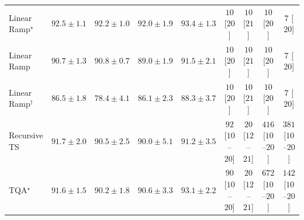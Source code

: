 \begin{tabular}{l|cccc|cccc|}
Linear Ramp$^\star$ & {\cellcolor[HTML]{045280}} \color[HTML]{F1F1F1} $92.5\pm 1.1$ & {\cellcolor[HTML]{045483}} \color[HTML]{F1F1F1} $92.2\pm 1.0$ & {\cellcolor[HTML]{045687}} \color[HTML]{F1F1F1} $92.0\pm 1.9$ & {\cellcolor[HTML]{034973}} \color[HTML]{F1F1F1} $93.4\pm 1.3$ & {\cellcolor[HTML]{FFF6F2}} \color[HTML]{000000} $10$ [$20$] & {\cellcolor[HTML]{FFF6F2}} \color[HTML]{000000} $10$ [$21$] & {\cellcolor[HTML]{FFF6F2}} \color[HTML]{000000} $10$ [$20$] & {\cellcolor[HTML]{FFF6F2}} \color[HTML]{000000} $7$ [$20$] \\
Linear Ramp & {\cellcolor[HTML]{045F95}} \color[HTML]{F1F1F1} $90.7\pm 1.3$ & {\cellcolor[HTML]{045F95}} \color[HTML]{F1F1F1} $90.8\pm 0.7$ & {\cellcolor[HTML]{0569A5}} \color[HTML]{F1F1F1} $89.0\pm 1.9$ & {\cellcolor[HTML]{045A8D}} \color[HTML]{F1F1F1} $91.5\pm 2.1$ & {\cellcolor[HTML]{FFF6F2}} \color[HTML]{000000} $10$ [$20$] & {\cellcolor[HTML]{FFF6F2}} \color[HTML]{000000} $10$ [$21$] & {\cellcolor[HTML]{FFF6F2}} \color[HTML]{000000} $10$ [$20$] & {\cellcolor[HTML]{FFF6F2}} \color[HTML]{000000} $7$ [$20$] \\
Linear Ramp$^\dagger$ & {\cellcolor[HTML]{187CB6}} \color[HTML]{F1F1F1} $86.5\pm 1.8$ & {\cellcolor[HTML]{91B5D6}} \color[HTML]{000000} $78.4\pm 4.1$ & {\cellcolor[HTML]{1C7FB8}} \color[HTML]{F1F1F1} $86.1\pm 2.3$ & {\cellcolor[HTML]{056DAC}} \color[HTML]{F1F1F1} $88.3\pm 3.7$ & {\cellcolor[HTML]{FFF6F2}} \color[HTML]{000000} $10$ [$20$] & {\cellcolor[HTML]{FFF6F2}} \color[HTML]{000000} $10$ [$21$] & {\cellcolor[HTML]{FFF6F2}} \color[HTML]{000000} $10$ [$20$] & {\cellcolor[HTML]{FFF6F2}} \color[HTML]{000000} $7$ [$20$] \\
Recursive TS & {\cellcolor[HTML]{04598C}} \color[HTML]{F1F1F1} $91.7\pm 2.0$ & {\cellcolor[HTML]{046097}} \color[HTML]{F1F1F1} $90.5\pm 2.5$ & {\cellcolor[HTML]{04639B}} \color[HTML]{F1F1F1} $90.0\pm 5.1$ & {\cellcolor[HTML]{045C90}} \color[HTML]{F1F1F1} $91.2\pm 3.5$ & {\cellcolor[HTML]{FDE2DF}} \color[HTML]{000000} $92$ [$10$--$20$] & {\cellcolor[HTML]{FFF3F0}} \color[HTML]{000000} $20$ [$12$--$21$] & {\cellcolor[HTML]{F15C9F}} \color[HTML]{F1F1F1} $416$ [$10$--$20$] & {\cellcolor[HTML]{F76EA3}} \color[HTML]{F1F1F1} $381$ [$10$--$20$] \\
TQA$^\star$ & {\cellcolor[HTML]{045A8D}} \color[HTML]{F1F1F1} $91.6\pm 1.5$ & {\cellcolor[HTML]{04629A}} \color[HTML]{F1F1F1} $90.2\pm 1.8$ & {\cellcolor[HTML]{046096}} \color[HTML]{F1F1F1} $90.6\pm 3.3$ & {\cellcolor[HTML]{034C78}} \color[HTML]{F1F1F1} $93.1\pm 2.2$ & {\cellcolor[HTML]{FDE3E0}} \color[HTML]{000000} $90$ [$10$--$20$] & {\cellcolor[HTML]{FFF3F0}} \color[HTML]{000000} $20$ [$12$--$21$] & {\cellcolor[HTML]{810178}} \color[HTML]{F1F1F1} $672$ [$10$--$20$] & {\cellcolor[HTML]{FDD5D1}} \color[HTML]{000000} $142$ [$10$--$20$] \\

\end{tabular}
